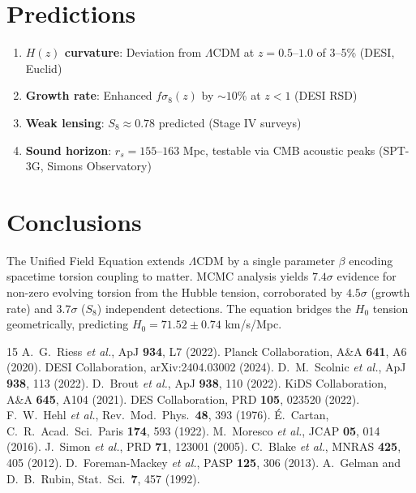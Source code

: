 \documentclass[twocolumn,prd,superscriptaddress,nofootinbib]{revtex4-2}
\begin{document}
\section{Predictions}
\label{sec:predictions}

\begin{enumerate}
\item \textbf{$H(z)$ curvature}: Deviation from $\Lambda$CDM at $z = 0.5$--$1.0$ of 3--5\% (DESI, Euclid)
\item \textbf{Growth rate}: Enhanced $f\sigma_8(z)$ by $\sim 10\%$ at $z < 1$ (DESI RSD)
\item \textbf{Weak lensing}: $S_8 \approx 0.78$ predicted (Stage IV surveys)
\item \textbf{Sound horizon}: $r_s = 155$--$163$ Mpc, testable via CMB acoustic peaks (SPT-3G, Simons Observatory)
\end{enumerate}

\section{Conclusions}

The Unified Field Equation extends $\Lambda$CDM by a single parameter $\beta$ encoding spacetime torsion coupling to matter. MCMC analysis yields $7.4\sigma$ evidence for non-zero evolving torsion from the Hubble tension, corroborated by $4.5\sigma$ (growth rate) and $3.7\sigma$ ($S_8$) independent detections. The equation bridges the $H_0$ tension geometrically, predicting $H_0 = 71.52 \pm 0.74$ km/s/Mpc.

\begin{thebibliography}{15}
 A.~G.~Riess \textit{et al.}, ApJ \textbf{934}, L7 (2022).
 Planck Collaboration, A\&A \textbf{641}, A6 (2020).
 DESI Collaboration, arXiv:2404.03002 (2024).
 D.~M.~Scolnic \textit{et al.}, ApJ \textbf{938}, 113 (2022).
 D.~Brout \textit{et al.}, ApJ \textbf{938}, 110 (2022).
 KiDS Collaboration, A\&A \textbf{645}, A104 (2021).
 DES Collaboration, PRD \textbf{105}, 023520 (2022).
 F.~W.~Hehl \textit{et al.}, Rev.\ Mod.\ Phys.\ \textbf{48}, 393 (1976).
 \'E.~Cartan, C.~R.\ Acad.\ Sci.\ Paris \textbf{174}, 593 (1922).
 M.~Moresco \textit{et al.}, JCAP \textbf{05}, 014 (2016).
 J.~Simon \textit{et al.}, PRD \textbf{71}, 123001 (2005).
 C.~Blake \textit{et al.}, MNRAS \textbf{425}, 405 (2012).
 D.~Foreman-Mackey \textit{et al.}, PASP \textbf{125}, 306 (2013).
 A.~Gelman and D.~B.~Rubin, Stat.\ Sci.\ \textbf{7}, 457 (1992).
\end{thebibliography}
\end{document}
